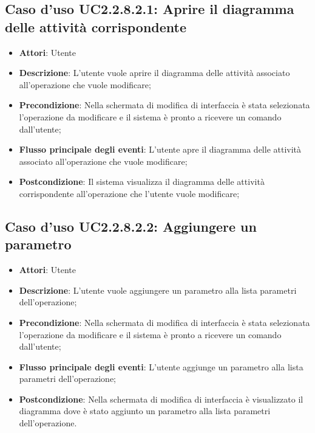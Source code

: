 \documentclass[../AnalisiDeiRequisiti.tex]{subfiles}
\begin{document}
			\subsection{Caso d'uso UC2.2.8.2.1: Aprire il diagramma delle attività corrispondente}
			\begin{itemize}
				\item \textbf{Attori}: Utente
				\item \textbf{Descrizione}: L'utente vuole aprire il diagramma delle attività associato all'operazione che vuole modificare;
				\item \textbf{Precondizione}: Nella schermata di modifica di interfaccia è stata selezionata l'operazione da modificare e il sistema è pronto a ricevere un comando dall'utente;
				\item \textbf{Flusso principale degli eventi}: L'utente apre il diagramma delle attività associato all'operazione che vuole modificare;
				\item \textbf{Postcondizione}: Il sistema visualizza il diagramma delle attività corrispondente all'operazione che l'utente vuole modificare;
			\end{itemize}
			\subsection{Caso d'uso UC2.2.8.2.2: Aggiungere un parametro}
			\begin{itemize}
				\item \textbf{Attori}: Utente
				\item \textbf{Descrizione}: L'utente vuole aggiungere un parametro alla lista parametri dell'operazione;
				\item \textbf{Precondizione}: Nella schermata di modifica di interfaccia è stata selezionata l'operazione da modificare e il sistema è pronto a ricevere un comando dall'utente;
				\item \textbf{Flusso principale degli eventi}: L'utente aggiunge un parametro alla lista parametri dell'operazione;
				\item \textbf{Postcondizione}: Nella schermata di modifica di interfaccia è visualizzato il diagramma dove è stato aggiunto un parametro alla lista parametri dell'operazione.
			\end{itemize}
\end{document}
